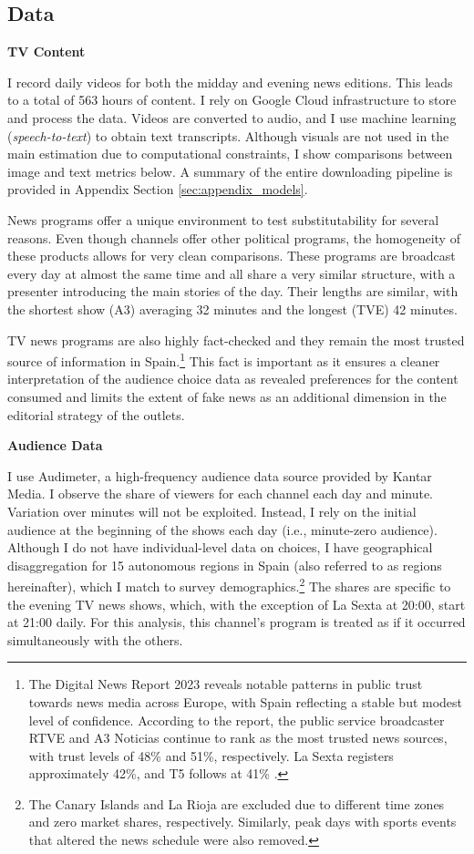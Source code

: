 \documentclass[12pt]{article}
\begin{document}
		\subsection{Data}
		
			\textbf{TV Content}
		
		I record daily  videos for both the midday and evening news editions. This leads to a total of 563 hours of content. I rely on Google Cloud infrastructure to store and process the data. Videos are converted to audio, and I use machine learning (\textit{speech-to-text}) to obtain text transcripts. Although visuals are not used in the main estimation due to computational constraints, I show comparisons between image and text metrics below. A summary of the entire downloading pipeline is provided in Appendix Section \ref{sec:appendix_models}.
		
		News programs offer a unique environment to test substitutability for several reasons. Even though channels offer other political programs, the homogeneity of these products allows for very clean comparisons. These programs are broadcast every day at almost the same time and all share a very similar structure, with a presenter introducing the main stories of the day. Their lengths are similar, with the shortest show (A3) averaging 32 minutes and the longest (TVE) 42 minutes.
		
		TV news programs are also highly fact-checked and they remain the most trusted source of information in Spain.\footnote{The Digital News Report 2023 reveals notable patterns in public trust towards news media across Europe, with Spain reflecting a stable but modest level of confidence. According to the report, the public service broadcaster RTVE and A3 Noticias continue to rank as the most trusted news sources, with trust levels of 48\% and 51\%, respectively. La Sexta registers  approximately 42\%, and T5 follows at 41\% \citep{reuters_dnr_2023}.} This fact is important as it ensures a cleaner interpretation of the audience choice data as revealed preferences for the content consumed and limits the extent of fake news as an additional dimension in the editorial strategy of the outlets. 
		
	
	\textbf{Audience Data}
	
	I use Audimeter, a high-frequency audience data source provided by Kantar Media. I observe the share of viewers for each channel  each day and minute. Variation over minutes will not be exploited. Instead, I rely on the initial audience at the beginning of the shows each day (i.e., minute-zero audience).
	Although I do not have individual-level data on choices, I have geographical disaggregation for 15 autonomous regions in Spain (also referred to as regions hereinafter), which I match to survey demographics.\footnote{The Canary Islands and La Rioja are excluded due to different time zones and zero market shares, respectively. Similarly, peak days with sports events that altered the news schedule were also removed.} The shares are specific to the evening TV news shows, which, with the exception of La Sexta at 20:00, start at 21:00 daily. For this analysis, this channel’s program is treated as if it occurred simultaneously with the others.
	
\end{document}
